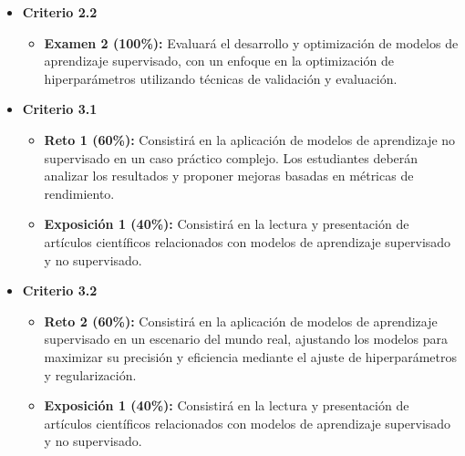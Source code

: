 \documentclass[a4,11pt]{aleph-notas}
\begin{document}
\begin{itemize}[leftmargin=*]
    \item \textbf{Criterio 2.2}
        \begin{itemize}[leftmargin=*]
            \item \textbf{Examen 2 (100\%):} Evaluará el desarrollo y optimización de modelos de aprendizaje supervisado, con un enfoque en la optimización de hiperparámetros utilizando técnicas de validación y evaluación.
        \end{itemize}
    \item \textbf{Criterio 3.1}
        \begin{itemize}[leftmargin=*]
            \item \textbf{Reto 1 (60\%):} Consistirá en la aplicación de modelos de aprendizaje no supervisado en un caso práctico complejo. Los estudiantes deberán analizar los resultados y proponer mejoras basadas en métricas de rendimiento.
            \item \textbf{Exposición 1 (40\%):} Consistirá en la lectura y presentación de artículos científicos relacionados con modelos de aprendizaje supervisado y no supervisado.
        \end{itemize}
    \item \textbf{Criterio 3.2}
        \begin{itemize}[leftmargin=*]
            \item \textbf{Reto 2 (60\%):} Consistirá en la aplicación de modelos de aprendizaje supervisado en un escenario del mundo real, ajustando los modelos para maximizar su precisión y eficiencia mediante el ajuste de hiperparámetros y regularización.
            \item \textbf{Exposición 1 (40\%):} Consistirá en la lectura y presentación de artículos científicos relacionados con modelos de aprendizaje supervisado y no supervisado.
        \end{itemize}
\end{itemize}
\end{document}

